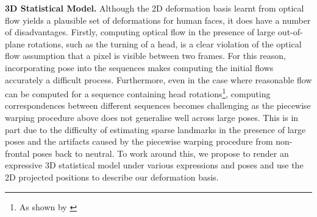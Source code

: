 \textbf{3D Statistical Model.}
Although the 2D deformation basis learnt from optical flow yields a plausible
set of deformations for human faces, it does have a number of disadvantages.
Firstly, computing optical flow in the presence of large out-of-plane rotations,
such as the turning of a head, is a clear violation of the optical flow assumption
that a pixel is visible between two frames. For this reason, incorporating pose into the
sequences makes computing the initial flows accurately a difficult process.
Furthermore, even in the case where reasonable flow can be computed for a
sequence containing head rotations\footnote{As shown by \citet{garg2013dense}},
computing correspondences between different sequences becomes challenging
as the piecewise warping procedure above does not generalise well across large
poses. This is in part due to the difficulty of estimating sparse landmarks
in the presence of large poses and the artifacts caused by the piecewise warping
procedure from non-frontal poses back to neutral.
To work around this, we propose to render an expressive 3D statistical model
under various expressions and poses and use the 2D projected positions
to describe our deformation basis.

